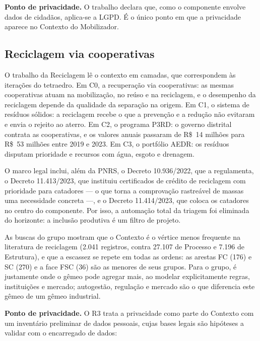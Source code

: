\documentclass[12pt,a4paper,article,oneside,english,brazil]{abntex2}
\begin{document}
\textbf{Ponto de privacidade.} O trabalho declara que, como o componente envolve dados de cidadãos, aplica-se a LGPD. É o único ponto em que a privacidade aparece no Contexto do Mobilizador.

\subsection{Reciclagem via cooperativas}

O trabalho da Reciclagem lê o contexto em camadas, que correspondem às iterações do tetraedro. Em C0, a recuperação via cooperativas: as mesmas cooperativas atuam na mobilização, no reúso e na reciclagem, e o desempenho da reciclagem depende da qualidade da separação na origem. Em C1, o sistema de resíduos sólidos: a reciclagem recebe o que a prevenção e a redução não evitaram e envia o rejeito ao aterro. Em C2, o programa P3RD: o governo distrital contrata as cooperativas, e os valores anuais passaram de R\$~14 milhões para R\$~53 milhões entre 2019 e 2023. Em C3, o portfólio AEDR: os resíduos disputam prioridade e recursos com água, esgoto e drenagem.

O marco legal inclui, além da PNRS, o Decreto 10.936/2022, que a regulamenta, o Decreto 11.413/2023, que instituiu certificados de crédito de reciclagem com prioridade para catadores --- o que torna a comprovação rastreável de massas uma necessidade concreta ---, e o Decreto 11.414/2023, que coloca os catadores no centro do componente. Por isso, a automação total da triagem foi eliminada do horizonte: a inclusão produtiva é um filtro de projeto.

As buscas do grupo mostram que o Contexto é o vértice menos frequente na literatura de reciclagem (2.041 registros, contra 27.107 de Processo e 7.196 de Estrutura), e que a escassez se repete em todas as ordens: as arestas FC (176) e SC (270) e a face FSC (36) são as menores de seus grupos. Para o grupo, é justamente onde o gêmeo pode agregar mais, ao modelar explicitamente regras, instituições e mercado; autogestão, regulação e mercado são o que diferencia este gêmeo de um gêmeo industrial.

\textbf{Ponto de privacidade.} O R3 trata a privacidade como parte do Contexto com um inventário preliminar de dados pessoais, cujas bases legais são hipóteses a validar com o encarregado de dados:
\end{document}

